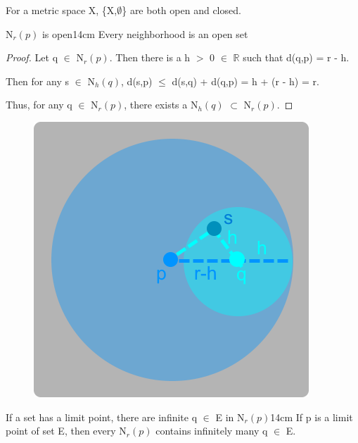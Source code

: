 	\hspace{0.7cm}
	For a metric space X, \{X,$\emptyset$\} are both open and closed.

	\vspace{0.5cm}



	\begin{wtheorem}{N$_r(p)$ is open}{14cm}
		Every neighborhood is an open set
	\end{wtheorem}
	
	\begin{proof}
		Let q $\in$ N$_r(p)$. Then there is a h $>$ 0 $\in$ $\mathbb{R}$
		such that d(q,p) = r - h.

		Then for any s $\in$ N$_h(q)$,
		d(s,p) $\leq$  d(s,q) + d(q,p) = h + (r - h) = r.

		Thus, for any q $\in$ N$_r(p)$, there exists a N$_h(q)$ $\subset$ N$_r(p)$.
	\end{proof}



	\begin{figure}[h]
		\centering
		\includegraphics[scale=0.34]{Images/5.1.3.png}
	\end{figure}

	\newpage



	\begin{wtheorem}{If a set has a limit point, there are infinite q
	$\in$ E in N$_r(p)$}{14cm}
		If p is a limit point of set E, then every N$_r(p)$
		contains infinitely many q $\in$ E.
	\end{wtheorem}
	
